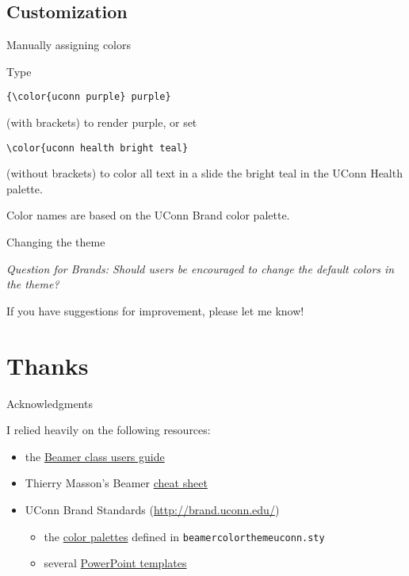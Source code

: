 \documentclass{beamer}
\begin{document}
\subsection{Customization}
\label{sec:customization}

\begin{frame}[fragile]{Manually assigning colors}

Type
\begin{verbatim}
{\color{uconn purple} purple}
\end{verbatim}
(with brackets) to render {\color{uconn purple} purple}, or set
\begin{verbatim}
\color{uconn health bright teal}
\end{verbatim}
\color{uconn health bright teal}
(without brackets) to color all text in a slide the bright teal in the UConn Health palette.

\color{black}\vfill
Color names are based on the UConn Brand color palette.

\center\href{http://brand.uconn.edu/standards/color-palette/}{}

\end{frame}


\begin{frame}{Changing the theme}

\emph{
\alert{Question for Brands:}
Should users be encouraged to change the default colors in the theme?
}

\vfill
If you have suggestions for improvement, please let me know!

\center\href{mailto:brunson@uchc.edu}{}

\end{frame}


\section{Thanks}

\begin{frame}{Acknowledgments}
\label{slide:acknowledgments}

I relied heavily on the following resources:
\begin{itemize}
\item the \href{http://texdoc.net/texmf-dist/doc/latex/beamer/doc/beameruserguide.pdf}{Beamer class users guide}
\item Thierry Masson's Beamer \href{http://www.cpt.univ-mrs.fr/~masson/latex/Beamer-appearance-cheat-sheet.pdf}{cheat sheet}
\item UConn Brand Standards (\url{http://brand.uconn.edu/})
\begin{itemize}
\item the \href{http://brand.uconn.edu/standards/color-palette/}{color palettes} defined in {\tt beamercolorthemeuconn.sty}
\item several \href{http://brand.uconn.edu/resources/powerpoint-templates/}{PowerPoint templates}
\end{itemize}
\end{itemize}

\end{frame}
\end{document}
